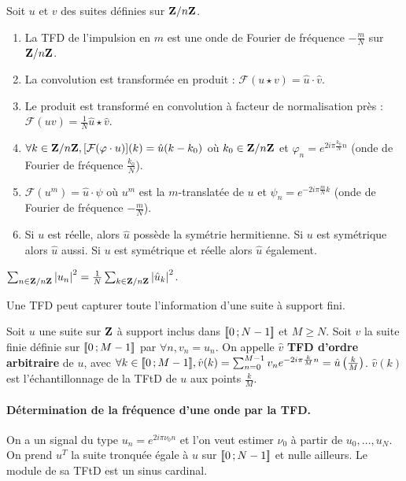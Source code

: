 \begin{pop}
	Soit $u$ et $v$ des suites définies sur $\mathbf{Z} / n\mathbf{Z}$.
	\begin{enumerate}
	\item
		La TFD de l'impulsion en $m$ est une onde de Fourier de fréquence $- \frac{m}{N}$ sur $\mathbf{Z} / n\mathbf{Z}$.
	\item
		La convolution est transformée en produit : $\mathcal{F} (u \star v) = \hat{u} \cdot \hat{v}$.
	\item
		Le produit est transformé en convolution à facteur de normalisation près : $\mathcal{F} (uv) = \frac{1}{N} \hat{u} \star \hat{v}$.
	\item
		$\forall k \in \mathbf{Z} / n\mathbf{Z}, [\mathcal{F}(\varphi \cdot u)](k) = \hat{u}(k - k_0)$ où $k_0 \in \mathbf{Z} / n\mathbf{Z}$ et $\varphi_n = e^{2i\pi \frac{k_0}{N}n}$ (onde de Fourier de fréquence $\frac{k_0}{N}$).
	\item
		$\mathcal{F}(u^m) = \hat{u} \cdot \psi$ où $u^m$ est la $m$-translatée de $u$ et $\psi_n = e^{-2i\pi \frac{m}{N}k}$ (onde de Fourier de fréquence $- \frac{m}{N}$).
	\item
		Si $u$ est réelle, alors $\hat{u}$ possède la symétrie hermitienne.
		Si $u$ est symétrique alors $\hat{u}$ aussi.
		Si $u$ est symétrique et réelle alors $\hat{u}$ également.
	\end{enumerate}
\end{pop}

\begin{pop}
	$\sum_{n \in \mathbf{Z} / n\mathbf{Z}} \left\lvert u_n\right\rvert^2 = \frac{1}{N} \sum_{k \in \mathbf{Z} / n\mathbf{Z}} \left\lvert\hat{u}_k\right\rvert^2$.
\end{pop}

\begin{rem}
	Une TFD peut capturer toute l'information d'une suite à support fini.
\end{rem}

\begin{defn}
	Soit $u$ une suite sur $\mathbf{Z}$ à support inclus dans $\mathopen{}\mathclose{\left[\![0\mathclose{}\mathpunct{};N - 1\right]\!]}$ et $M \geq N$.
	Soit $v$ la suite finie définie sur $\mathopen{}\mathclose{\left[\![0\mathclose{}\mathpunct{};M - 1\right]\!]}$ par $\forall n, v_n = u_n$.
	On appelle $\hat{v}$ \textbf{TFD d'ordre arbitraire} de $u$, avec $\forall k \in \mathopen{}\mathclose{\left[\![0\mathclose{}\mathpunct{};M - 1\right]\!]}, \hat{v}(k) = \sum_{n = 0}^{M - 1} v_n e^{-2i\pi \frac{k}{M} n} = \hat{u} \left( \frac{k}{M} \right)$.
	$\hat{v}(k)$ est l'échantillonnage de la TFtD de $u$ aux points $\frac{k}{M}$.
\end{defn}

\paragraph{Détermination de la fréquence d'une onde par la TFD.}
On a un signal du type $u_n = e^{2i\pi \nu_0 n}$ et l'on veut estimer $\nu_0$ à partir de $u_0,\ldots,u_N$.
On prend $u^T$ la suite tronquée égale à $u$ sur $\mathopen{}\mathclose{\left[\![0\mathclose{}\mathpunct{};N - 1\right]\!]}$ et nulle ailleurs.
Le module de sa TFtD est un sinus cardinal.

